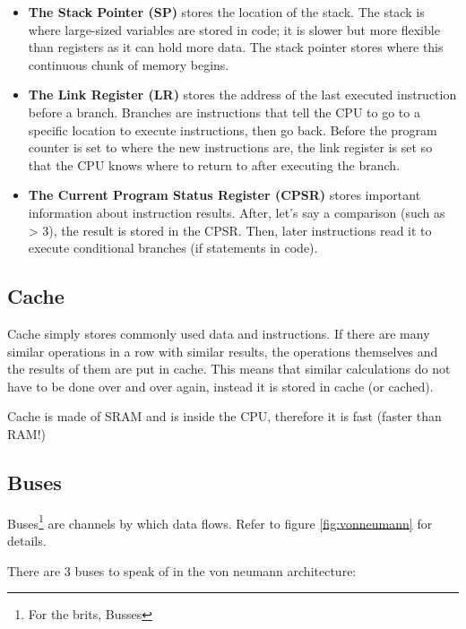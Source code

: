 \documentclass[../main.tex]{subfiles}
\begin{document}
\begin{itemize}
    \item \textbf{The Stack Pointer (SP)} stores the location of the stack. The stack is where large-sized variables are stored in code; it is slower but more flexible than registers as it can hold more data. The stack pointer stores where this continuous chunk of memory begins.
    \item \textbf{The Link Register (LR)} stores the address of the last executed instruction before a branch. Branches are instructions that tell the CPU to go to a specific location to execute instructions, then go back. Before the program counter is set to where the new instructions are, the link register is set so that the CPU knows where to return to after executing the branch.
    \item \textbf{The Current Program Status Register (CPSR)} stores important information about instruction results. After, let's say a comparison (such as { > 3}), the result is stored in the CPSR. Then, later instructions read it to execute conditional branches (if statements in code).
\end{itemize}

\subsection{Cache}

Cache simply stores commonly used data and instructions. If there are many similar operations in a row with similar results, the operations themselves and the results of them are put in cache. This means that similar calculations do not have to be done over and over again, instead it is stored in cache (or cached).

Cache is made of SRAM and is inside the CPU, therefore it is fast (faster than RAM!)

\subsection{Buses}

Buses\footnote{For the brits, Busses} are channels by which data flows. Refer to figure \ref{fig:vonneumann} for details.

There are 3 buses to speak of in the von neumann architecture:
\end{document}

